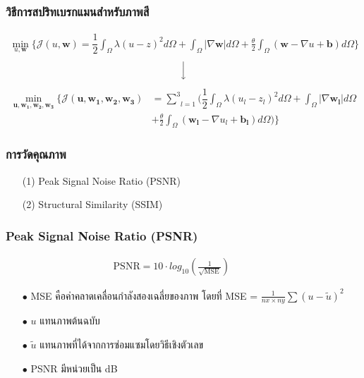 \documentclass[xcolor=dvipsnames, xetex,serif]{beamer}
\numberwithin{equation}{section}
\begin{document}
    \begin{frame}
    \frametitle{วิธีการสปริทเบรกแมนสำหรับภาพสี}
        \begin{align*}
        \min_{u,\boldsymbol{w}} \{ \mathcal{J}(u,\boldsymbol{w}) = \dfrac{1}{2} \int_{\Omega} \lambda(u-z)^2 d\Omega +  \int_{\Omega}  |\nabla \boldsymbol{w}|  d\Omega + \frac{\theta}{2} \int_{\Omega} (\boldsymbol{w} - \nabla u + \boldsymbol{b}) d\Omega \}
        \end{align*}
        \begin{align*}
        \Big \downarrow
        \end{align*}
        \begin{align*}
        \min_{\boldsymbol{u},\boldsymbol{w_1},\boldsymbol{w_2},\boldsymbol{w_3}} \{ \mathcal{J}(\boldsymbol{u},\boldsymbol{w_1},\boldsymbol{w_2},\boldsymbol{w_3}) &= \underset{l=1}{\overset{3}{\sum}} (  \dfrac{1}{2} \int_{\Omega} \lambda(u_l-z_l)^2 d\Omega +  \int_{\Omega}  |\nabla \boldsymbol{w_l}|  d\Omega \\ &+ \frac{\theta}{2} \int_{\Omega} (\boldsymbol{w_l} - \nabla u_l+ \boldsymbol{b_l}) d\Omega ) \}
        \end{align*}
    \end{frame}
    \begin{frame}
        \frametitle{การวัดคุณภาพ}
        \begin{itemize}
            \item[(1)] Peak Signal Noise Ratio (PSNR)
            \item[(2)] Structural Similarity (SSIM)
        \end{itemize}
    \end{frame}
    \begin{frame}
        \frametitle{Peak Signal Noise Ratio (PSNR)}
        \begin{align*}
        \text{PSNR}  = 10 \cdot log_{10} ( \frac{1}{\sqrt{\text{MSE}}} )  \hspace{1cm}
        \end{align*}
        \begin{itemize}
            \item[$\bullet$] MSE คือค่าคลาดเคลื่อนกำลังสองเฉลี่ยของภาพ โดยที่ MSE = $\frac{1}{nx \times ny} \sum (u - \tilde{u})^2 $
            \item[$\bullet$] $u$ แทนภาพต้นฉบับ
            \item[$\bullet$] $\tilde{u}$  แทนภาพที่ได้จากการซ่อมแซมโดยวิธีเชิงตัวเลข
            \item[$\bullet$] PSNR มีหน่วยเป็น dB
        \end{itemize}
    \end{frame}
\end{document}
